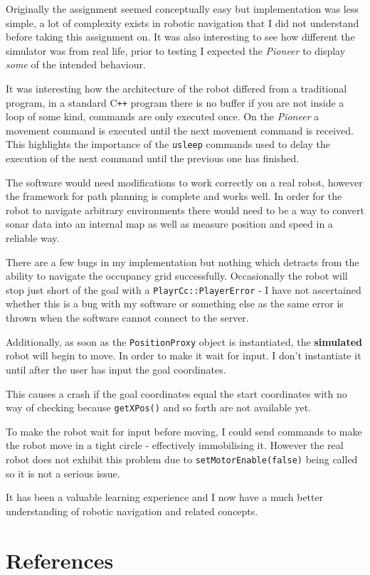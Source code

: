 \documentclass[a4paper,12pt]{article}
\begin{document}
Originally the assignment seemed conceptually easy but implementation was less simple, a lot of complexity exists in robotic navigation that I did not understand before taking this assignment on. It was also interesting to see how different the simulator was from real life, prior to testing I expected the \textit{Pioneer} to display \textit{some} of the intended behaviour.

It was interesting how the architecture of the robot differed from a traditional program, in a standard C\texttt{++} program there is no buffer if you are not inside a loop of some kind, commands are only executed once. On the \textit{Pioneer} a movement command is executed until the next movement command is received. This highlights the importance of the \texttt{usleep} commands used to delay the execution of the next command until the previous one has finished.

The software would need modifications to work correctly on a real robot, however the framework for path planning is complete and works well. In order for the robot to navigate arbitrary environments there would need to be a way to convert sonar data into an internal map as well as measure position and speed in a reliable way. 

There are a few bugs in my implementation but nothing which detracts from the ability to navigate the occupancy grid successfully. Occasionally the robot will stop just short of the goal with a \texttt{PlayrCc::PlayerError} - I have not ascertained whether this is a bug with my software or something else as the same error is thrown when the software cannot connect to the server.

Additionally, as soon as the \texttt{PositionProxy} object is instantiated, the \textbf{simulated} robot will begin to move. In order to make it wait for input. I don't instantiate it until after the user has input the goal coordinates. 

This causes a crash if the goal coordinates equal the start coordinates with no way of checking because \texttt{getXPos()} and so forth are not available yet. 

To make the robot wait for input before moving, I could send commands to make the robot move in a tight circle - effectively immobilising it. However the real robot does not exhibit this problem due to \texttt{setMotorEnable(false)} being called so it is not a serious issue.

It has been a valuable learning experience and I now have a much better understanding of robotic navigation and related concepts.
\section{References}

\end{document}
